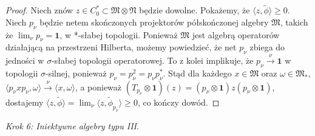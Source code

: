 \begin{proof}
Niech znów $z \in C_{0}^{*} \subset \mathfrak{M} \otimes \mathfrak{N}$
będzie dowolne.
Pokażemy, że $\langle z, \tilde{\phi} \rangle \geq 0$.
Niech $p_{\nu}$ będzie netem skończonych projektorów
półskończonej algebry $\mathfrak{M}$,
takich że $\lim_{\nu} p_{\nu} = \mathbf{1}$,
w *-słabej topologii.
Ponieważ $\mathfrak{M}$ jest algebrą operatorów działającą
na przestrzeni Hilberta,
możemy powiedzieć, że net $p_{\nu}$ zbiega do jedności w
$\sigma$-słabej topologii operatorowej.
To z kolei implikuje, że
$p_{\nu} \stackrel{\nu}{\rightarrow} \mathbf{1}$ w topologii $\sigma$-silnej,
ponieważ $p_{\nu} = p_{\nu}^2= p_{\nu} p_{\nu}^{*}$.
Stąd dla każdego $x \in \mathfrak{M}$ oraz $\omega \in \mathfrak{M}_{*}$,
$\langle p_{\nu} x p_{\nu}, \omega \rangle\stackrel{\nu}{\rightarrow}
\langle x, \omega \rangle$, a ponieważ
$(T_{p_{\nu}} \otimes \mathbf{1})(z) =
(p_{\nu} \otimes \mathbf{1}) z (p_{\nu} \otimes \mathbf{1})$,
dostajemy $\langle z, \tilde{\phi} \rangle
= \lim_{\nu} \langle z, \tilde{\phi}_{p_{\nu}} \rangle \geq 0$,
co kończy dowód.
\end{proof}

{\it Krok 6: Iniektywne algebry typu III}.

